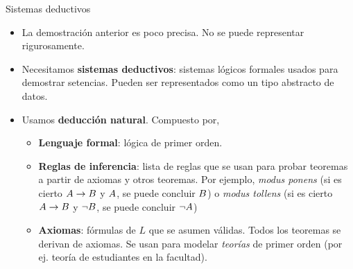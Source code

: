 \documentclass[xcolor={dvipsnames},spanish]{beamer}
\begin{document}
\begin{frame}{Sistemas deductivos}
    \begin{itemize}
        \item La demostración anterior es poco precisa. No se puede representar rigurosamente.
        \item Necesitamos \textbf{sistemas deductivos}: sistemas lógicos formales usados para demostrar setencias. Pueden ser representados como un tipo abstracto de datos.
        \item Usamos \textbf{deducción natural}. Compuesto por,
        \begin{itemize}
            \item \textbf{Lenguaje formal}: lógica de primer orden.
            \item \textbf{Reglas de inferencia}: lista de reglas que se usan para probar teoremas a partir de axiomas y otros teoremas. Por ejemplo, \textit{modus ponens} (si
    es cierto $A \to B$ y $A$, se puede concluir $B$) o
    \textit{modus tollens} (si es cierto $A \to B$ y $\neg
    B$, se puede concluir $\neg A$)
    \item \textbf{Axiomas}: fórmulas de $L$ que se asumen válidas. Todos los
    teoremas se derivan de axiomas. Se usan para modelar \textit{teorías} de
    primer orden (por ej. teoría de estudiantes en la facultad).
        \end{itemize}
    \end{itemize}
\end{frame}
\end{document}
